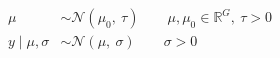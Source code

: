 \begin{align}
  \mu &\sim \mathcal{N}(\mu_0,\ \tau) \qquad \mu, \mu_0 \in \mathbb{R}^{G}, \ \tau > 0 \\
  y \mid \mu, \sigma &\sim \mathcal{N}(\mu,\ \sigma) \qquad \sigma > 0
\end{align}
